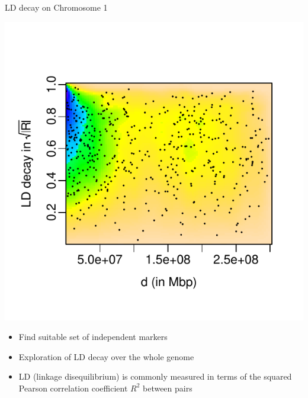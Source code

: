 \documentclass[a0paper,portrait]{baposter}
\begin{document}
\begin{poster}
{\begin{minipage}{0.33\textwidth}
%
\end{minipage}
%
\hspace{0.1cm}
\begin{minipage}{0.33 \textwidth}
\vspace{0.4cm}
\centering
LD decay on Chromosome 1
\begin{center}
\vspace{-1.0cm}
\includegraphics[width=0.6\linewidth]{SchnabelTorrettaWesthuesFigure1A}
\end{center}
\vspace{-0.8cm}
\end{minipage}
%
\hspace{-0.5cm}
\begin{minipage}{0.33 \textwidth}
\vspace{-0.5cm}
\begin{itemize}[leftmargin=*]
	\item Find suitable set of independent markers 
	\item Exploration of LD decay over the whole genome
	\item LD (linkage disequilibrium) is commonly measured in terms of the squared Pearson correlation coefficient $R^2$ between pairs 

\end{itemize}
\end{minipage}}
\end{poster}
\end{document}
